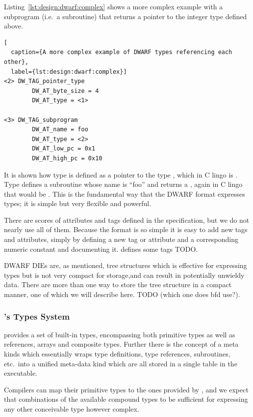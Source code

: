 Listing~\ref{lst:design:dwarf:complex} shows a more complex example with a
subprogram (i.e.~a subroutine) that returns a pointer to the integer type
defined above.

\begin{lstlisting}[
  caption={A more complex example of DWARF types referencing each other},
  label={lst:design:dwarf:complex}]
<2> DW_TAG_pointer_type
        DW_AT_byte_size = 4
        DW_AT_type = <1>

<3> DW_TAG_subprogram
        DW_AT_name = foo
        DW_AT_type = <2>
        DW_AT_low_pc = 0x1
        DW_AT_high_pc = 0x10
\end{lstlisting}

It is shown how type  is defined as a pointer to the type ,
which in C lingo is . Type  defines a subroutine whose name
is ``foo'' and returns a , again in C lingo that would be . This is the fundamental way that the DWARF format expresses types; it
is simple but very flexible and powerful.

There are scores of attributes and tags defined in the specification, but we do
not nearly use all of them. Because the format is so simple it is easy to add
new tags and attributes, simply by defining a new tag or attribute and a
corresponding numeric constant and documenting it. \thename{} defines some tags
TODO.

DWARF DIEs are, as mentioned, tree structures which is effective for expressing
types but is not very compact for storage,and can result in potentially unwieldy
data. There are more than one way to store the tree structure in a compact
manner, one of which we will describe here. TODO (which one does bfd use?).

\subsubsection{\thename{}'s Types System}

\thename{} provides a set of built-in types, encompassing both primitive types
as well as references, arrays and composite types. Further there is the concept
of a meta kinds which essentially wraps type definitions, type references,
subroutines, etc.~into a unified meta-data kind which are all stored in a single
table in the executable.

Compilers can map their primitive types to the ones provided by \thename{}, and
we expect that combinations of the available compound types to be sufficient for
expressing any other conceivable type however complex.

